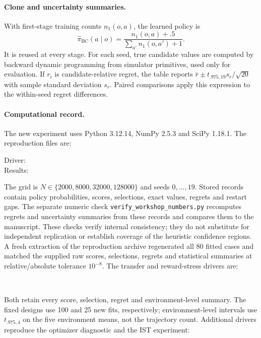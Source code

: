 \documentclass[11pt]{article}
\begin{document}
\paragraph{Clone and uncertainty summaries.}
With first-stage training counts $n_1(o,a)$, the learned policy is
\[
 \hat\pi_{\mathrm{BC}}(a\mid o)
 =\frac{n_1(o,a)+.5}{\sum_{a'}n_1(o,a')+1}.
\]
It is reused at every stage. For each seed, true candidate values are computed
by backward dynamic programming from simulator primitives, used only for
evaluation. If $r_i$ is candidate-relative regret, the table reports
$\bar r\pm t_{.975,19}s_r/\sqrt{20}$ with sample standard deviation $s_r$.
Paired comparisons apply this expression to the within-seed regret differences.

\paragraph{Computational record.}
The new experiment uses Python 3.12.14, NumPy 2.5.3 and SciPy 1.18.1.
The reproduction files are:
\begin{flushleft}\small
Driver: \\
Results: 
\end{flushleft}
The grid is $N\in\{2000,8000,32000,128000\}$ and seeds $0,\ldots,19$.
Stored records contain policy probabilities, scores, selections, exact values,
regrets and restart gaps. The separate numeric check
\texttt{verify\_workshop\_numbers.py} recomputes regrets and uncertainty
summaries from these records and compares them to the manuscript.
These checks verify internal consistency; they do not substitute for independent
replication or establish coverage of the heuristic confidence regions.
A fresh extraction of the reproduction archive regenerated all 80 fitted
cases and matched the supplied raw scores, selections, regrets and statistical
summaries at relative/absolute tolerance $10^{-8}$.
The transfer and reward-stress drivers are:
\begin{flushleft}\small
{}\\
\end{flushleft}
Both retain every score,
selection, regret and environment-level summary. The fixed designs use
100 and 25 new fits, respectively; environment-level intervals use
$t_{.975,4}$ on the five environment means, not the trajectory count.
Additional drivers reproduce the optimizer diagnostic and the IST experiment:
\end{document}
